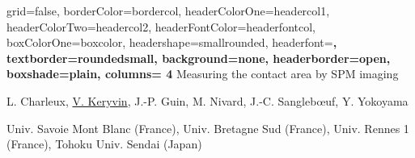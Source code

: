 \documentclass[a0paper,portrait]{baposter}
\begin{document}
\begin{poster}{
	grid=false,
	borderColor=bordercol,
	headerColorOne=headercol1,
	headerColorTwo=headercol2,
	headerFontColor=headerfontcol,
	boxColorOne=boxcolor,
	headershape=smallrounded,
	headerfont=\Large\sf\bf,
	textborder=roundedsmall,
	background=none,
	headerborder=open,
    boxshade=plain,
    columns= 4
}
{}
{
Measuring the contact area by SPM imaging
}
{
{\color{red}L. Charleux}, {\color{green}\underline{V. Keryvin}}, {\color{cyan}J.-P. Guin, M. Nivard, J.-C. Sangleb\oe uf}, {\color{blue}Y. Yokoyama}

\begin{small}
{\color{red}Univ. Savoie Mont Blanc (France)}, {\color{green}Univ. Bretagne Sud (France)}, {\color{cyan}Univ. Rennes 1 (France)}, {\color{blue}Tohoku Univ. Sendai (Japan)}
\end{small}

}
{

%

}




\end{poster}
\end{document}
